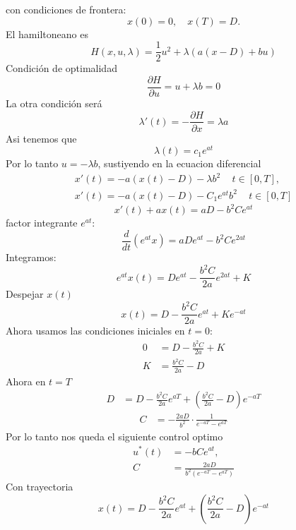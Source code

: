 \documentclass{uofa-eng-assignment}
\begin{document}
\begin{enumerate}
con condiciones de frontera:
\[
x(0)=0, \quad x(T)=D.
\]
El hamiltoneano es
\[
H(x,u,\lambda)=\frac{1}{2}u^2+\lambda(a(x-D)+bu)
\]
Condición de optimalidad
\[
\frac{\partial H}{\partial u}=u+\lambda b=0
\]
La otra condición será
\[
\lambda'(t)=-\frac{\partial H}{\partial x}=\lambda a
\]
Asi tenemos que
\[
\lambda(t)= c_1 e^{at}
\]
Por lo tanto $u=-\lambda b$, sustiyendo en la ecuacion diferencial
\begin{align*}
x'(t) = -a(x(t)-D) -\lambda b^2\, \quad t \in [0,T], \\
x'(t) = -a(x(t)-D) -C_1 e^{at}b^2\, \quad t \in [0,T]
\end{align*}
\[
x'(t) + a x(t) = aD - b^2 C e^{at}
\]
factor integrante $e^{at}$:
\[
\frac{d}{dt}\left(e^{at} x\right) = aD e^{at} - b^2 C e^{2at}
\]
Integramos:
\[
e^{at} x(t) = D e^{at} - \frac{b^2 C}{2a} e^{2at} + K
\]
 Despejar $x(t)$
\[
x(t) = D - \frac{b^2 C}{2a} e^{at} + K e^{-at}
\]
Ahora usamos las condiciones iniciales en  $t = 0$: 
\begin{align*}
0 &= D - \frac{b^2 C}{2a} + K \\
K &= \frac{b^2 C}{2a} - D
\end{align*}
Ahora en $t=T$
\begin{align*}
D &= D - \frac{b^2 C}{2a} e^{aT} 
    + \left( \frac{b^2 C}{2a} - D \right) e^{-aT}
\end{align*}
\begin{align*}
C &= -\frac{2aD}{b^2} \cdot \frac{1}{e^{-aT} - e^{aT}}
\end{align*}
Por lo tanto nos queda el siguiente control optimo
\begin{align*}
u^*(t) &= -bC e^{at}, \\
C &= \frac{2aD}{b^2 \left(e^{-aT} - e^{aT}\right)}
\end{align*}
Con trayectoria
\[
x(t) = D - \frac{b^2 C}{2a} e^{at} + \left( \frac{b^2 C}{2a} - D \right) e^{-at}
\]
\end{enumerate}
\end{document}
